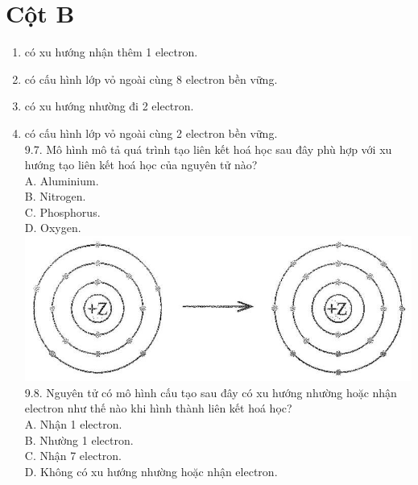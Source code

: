 \documentclass[10pt]{article}
\begin{document}
\section*{Cột B}
\begin{enumerate}
  \item có xu hướng nhận thêm 1 electron.
  \item có cấu hình lớp vỏ ngoài cùng 8 electron bền vững.
  \item có xu hướng nhường đi 2 electron.
  \item có cấu hình lớp vỏ ngoài cùng 2 electron bền vững.\\
9.7. Mô hình mô tả quá trình tạo liên kết hoá học sau đây phù hợp với xu hướng tạo liên kết hoá học của nguyên tử nào?\\
A. Aluminium.\\
B. Nitrogen.\\
C. Phosphorus.\\
D. Oxygen.\\
\includegraphics[max width=\textwidth, center]{2025_10_23_76620c17ffac1ae9b35bg-25(1)}\\
9.8. Nguyên tử có mô hình cấu tạo sau đây có xu hướng nhường hoặc nhận electron như thế nào khi hình thành liên kết hoá học?\\
A. Nhận 1 electron.\\
B. Nhường 1 electron.\\
C. Nhận 7 electron.\\
D. Không có xu hướng nhường hoặc nhận electron.\\

\end{enumerate}
\end{document}
